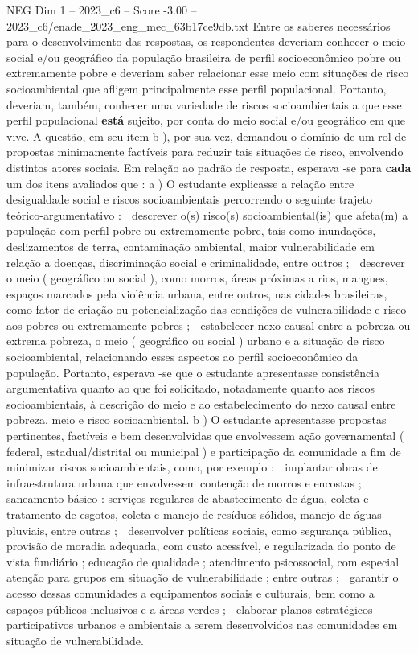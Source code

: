 \begin{textsample}{NEG Dim 1 – 2023\_c6 – Score -3.00 – 2023\_c6/enade\_2023\_eng\_mec\_63b17ce9db.txt}
Entre os saberes necessários para o desenvolvimento das respostas, os respondentes deveriam conhecer o meio social e/ou geográfico da população brasileira de perfil socioeconômico pobre ou extremamente pobre e deveriam saber relacionar esse meio com situações de risco socioambiental que afligem principalmente esse perfil populacional.
Portanto, deveriam, também, conhecer uma variedade de riscos socioambientais a que esse perfil populacional \textbf{está} sujeito, por conta do meio social e/ou geográfico em que vive.
A questão, em seu item b ), por sua vez, demandou o domínio de um rol de propostas minimamente factíveis para reduzir tais situações de risco, envolvendo distintos atores sociais.
Em relação ao padrão de resposta, esperava -se para \textbf{cada} um dos itens avaliados que : a ) O estudante explicasse a relação entre desigualdade social e riscos socioambientais percorrendo o seguinte trajeto teórico-argumentativo :  descrever o(s) risco(s) socioambiental(is) que afeta(m) a população com perfil pobre ou extremamente pobre, tais como inundações, deslizamentos de terra, contaminação ambiental, maior vulnerabilidade em relação a doenças, discriminação social e criminalidade, entre outros ;  descrever o meio ( geográfico ou social ), como morros, áreas próximas a rios, mangues, espaços marcados pela violência urbana, entre outros, nas cidades brasileiras, como fator de criação ou potencialização das condições de vulnerabilidade e risco aos pobres ou extremamente pobres ;  estabelecer nexo causal entre a pobreza ou extrema pobreza, o meio ( geográfico ou social ) urbano e a situação de risco socioambiental, relacionando esses aspectos ao perfil socioeconômico da população.
Portanto, esperava -se que o estudante apresentasse consistência argumentativa quanto ao que foi solicitado, notadamente quanto aos riscos socioambientais, à descrição do meio e ao estabelecimento do nexo causal entre pobreza, meio e risco socioambiental. b ) O estudante apresentasse propostas pertinentes, factíveis e bem desenvolvidas que envolvessem ação governamental ( federal, estadual/distrital ou municipal ) e participação da comunidade a fim de minimizar riscos socioambientais, como, por exemplo :  implantar obras de infraestrutura urbana que envolvessem contenção de morros e encostas ; saneamento básico : serviços regulares de abastecimento de água, coleta e tratamento de esgotos, coleta e manejo de resíduos sólidos, manejo de águas pluviais, entre outras ;  desenvolver políticas sociais, como segurança pública, provisão de moradia adequada, com custo acessível, e regularizada do ponto de vista fundiário ; educação de qualidade ; atendimento psicossocial, com especial atenção para grupos em situação de vulnerabilidade ; entre outras ;  garantir o acesso dessas comunidades a equipamentos sociais e culturais, bem como a espaços públicos inclusivos e a áreas verdes ;  elaborar planos estratégicos participativos urbanos e ambientais a serem desenvolvidos nas comunidades em situação de vulnerabilidade.

\end{textsample}
